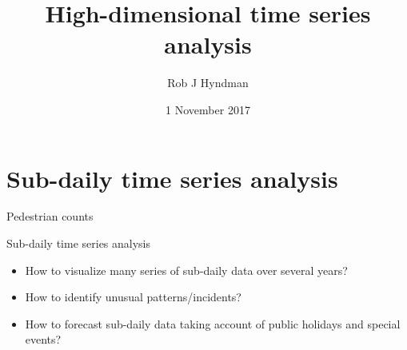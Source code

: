 \documentclass[14pt]{beamer}
\title{High-dimensional time series analysis}
\author{Rob J Hyndman}
\date{1 November 2017}
\begin{document}
\begin{frame}[plain]
\titlepage
{}
\end{frame}\fontsize{15}{17}\sf

\section{Sub-daily time series analysis}

\begin{frame}{Pedestrian counts}



\end{frame}

\begin{frame}{Sub-daily time series analysis}

\begin{itemize}
\item
  How to visualize many series of sub-daily data over several years?
\item
  How to identify unusual patterns/incidents?
\item
  How to forecast sub-daily data taking account of public holidays and
  special events?
\end{itemize}

\vspace*{10cm}



\end{frame}
\end{document}

